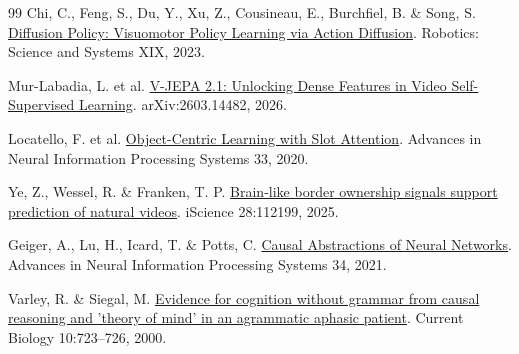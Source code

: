 \documentclass[11pt]{article}
\begin{document}
\begin{thebibliography}{99}
 Chi, C., Feng, S., Du, Y., Xu, Z., Cousineau, E., Burchfiel, B. \& Song, S. \href{https://diffusion-policy.cs.columbia.edu/}{Diffusion Policy: Visuomotor Policy Learning via Action Diffusion}. Robotics: Science and Systems XIX, 2023.

 Mur-Labadia, L. et al. \href{https://arxiv.org/abs/2603.14482}{V-JEPA 2.1: Unlocking Dense Features in Video Self-Supervised Learning}. arXiv:2603.14482, 2026.

 Locatello, F. et al. \href{https://proceedings.neurips.cc/paper_files/paper/2020/hash/8511df98c02ab60aea1b2356c013bc0f-Abstract.html}{Object-Centric Learning with Slot Attention}. Advances in Neural Information Processing Systems 33, 2020.

 Ye, Z., Wessel, R. \& Franken, T. P. \href{https://doi.org/10.1016/j.isci.2025.112199}{Brain-like border ownership signals support prediction of natural videos}. iScience 28:112199, 2025.

 Geiger, A., Lu, H., Icard, T. \& Potts, C. \href{https://proceedings.neurips.cc/paper_files/paper/2021/hash/4f5c422f4d49a5a807eda27434231040-Abstract.html}{Causal Abstractions of Neural Networks}. Advances in Neural Information Processing Systems 34, 2021.

 Varley, R. \& Siegal, M. \href{https://pubmed.ncbi.nlm.nih.gov/10873809/}{Evidence for cognition without grammar from causal reasoning and 'theory of mind' in an agrammatic aphasic patient}. Current Biology 10:723--726, 2000.

\end{thebibliography}
\end{document}
